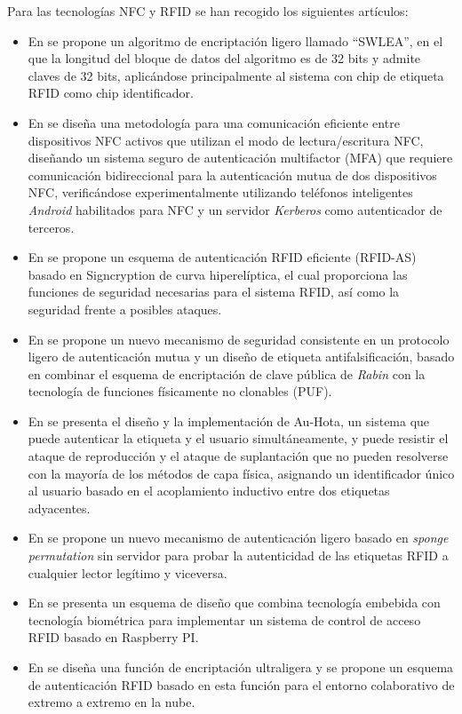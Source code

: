 \documentclass[12pt,a4paper,onecolumn,oneside]{report}
\begin{document}
Para las tecnologías NFC y RFID se han recogido los siguientes artículos:
\begin{itemize}
\item En \cite{eauno} se propone un algoritmo de encriptación ligero llamado ``SWLEA”, en el que la longitud del bloque de datos del algoritmo es de 32 bits y admite claves de 32 bits, aplicándose principalmente al sistema con chip de etiqueta RFID como chip identificador.
\item En \cite{eados} se diseña una metodología para una comunicación eficiente entre dispositivos NFC activos que utilizan el modo de lectura/escritura NFC, diseñando un sistema seguro de autenticación multifactor (MFA) que requiere comunicación bidireccional para la autenticación mutua de dos dispositivos NFC, verificándose experimentalmente utilizando teléfonos inteligentes \textit{Android} habilitados para NFC y un servidor \textit{Kerberos} como autenticador de terceros.
\item En \cite{eatres} se propone un esquema de autenticación RFID eficiente (RFID-AS) basado en Signcryption de curva hiperelíptica, el cual proporciona las funciones de seguridad necesarias para el sistema RFID, así como la seguridad frente a posibles ataques.
\item En \cite{eacuatro} se propone un nuevo mecanismo de seguridad consistente en un protocolo ligero de autenticación mutua y un diseño de etiqueta antifalsificación, basado en combinar el esquema de encriptación de clave pública de \textit{Rabin} con la tecnología de funciones físicamente no clonables (PUF).
\item En \cite{eacinco} se presenta el diseño y la implementación de Au-Hota, un sistema que puede autenticar la etiqueta y el usuario simultáneamente, y puede resistir el ataque de reproducción y el ataque de suplantación que no pueden resolverse con la mayoría de los métodos de capa física, asignando un identificador único al usuario basado en el acoplamiento inductivo entre dos etiquetas adyacentes.
\item En \cite{easeis} se propone un nuevo mecanismo de autenticación ligero basado en \textit{sponge permutation} sin servidor para probar la autenticidad de las etiquetas RFID a cualquier lector legítimo y viceversa.
\item En \cite{easiete} se presenta un esquema de diseño que combina tecnología embebida con tecnología biométrica para implementar un sistema de control de acceso RFID basado en Raspberry PI.
\item En \cite{eaocho} se diseña una función de encriptación ultraligera y se propone un esquema de autenticación RFID basado en esta función para el entorno colaborativo de extremo a extremo en la nube.
\end{itemize}
\end{document}

